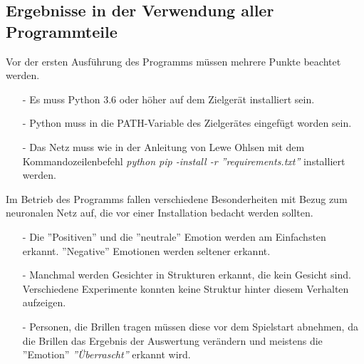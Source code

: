\documentclass[12pt,a4paper,headinclude,twoside, plainheadsepline, open=right,numbers=noenddot]{scrreprt}
\begin{document}
\subsection{Ergebnisse in der Verwendung aller Programmteile}
Vor der ersten Ausf\"{u}hrung des Programms m\"{u}ssen mehrere Punkte beachtet werden.
\begin{itemize}
\item[-] Es muss Python 3.6 oder h\"{o}her auf dem Zielger\"{a}t installiert sein.
\item[-] Python muss in die PATH-Variable des Zielger\"{a}tes eingef\"{u}gt worden sein.
\item[-] Das Netz muss wie in der Anleitung\cite{LeweOhlsenGit} von Lewe Ohlsen mit dem Kommandozeilenbefehl \textit{python pip -install -r ''requirements.txt''} installiert werden.
\end{itemize} 
Im Betrieb des Programms fallen verschiedene Besonderheiten mit Bezug zum neuronalen Netz auf, die vor einer Installation bedacht werden sollten.
\begin{itemize}
\item[-] Die ''Positiven'' und die ''neutrale'' Emotion werden am Einfachsten erkannt. ''Negative'' Emotionen werden seltener erkannt.
\item[-] Manchmal werden Gesichter in Strukturen erkannt, die kein Gesicht sind. Verschiedene Experimente konnten keine Struktur hinter diesem Verhalten aufzeigen.
\item[-] Personen, die Brillen tragen m\"{u}ssen diese vor dem Spielstart abnehmen, da die Brillen das Ergebnis der Auswertung ver\"{a}ndern und meistens die ''Emotion'' \textit{''\"{U}berrascht''} erkannt wird. 
\end{itemize}
\end{document}
